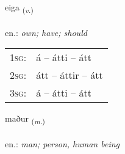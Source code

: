 \documentclass[frontgrid, backgrid]{flacards}\usepackage[]{graphicx}\usepackage[]{xcolor}
\begin{document}
{eiga \small{\textsubscript{(\textit{v.})}} \\[1ex] %
\textphonetic{[eiːɣa]} \\
en.: \emph{own; have; should} \\  [2ex]
\renewcommand*{\arraystretch}{0.8}
\begin{tabular}{p{1cm}l}
\textsc{1sg}: & á -- átti -- átt \\ 
\textsc{2sg}: & átt -- áttir -- átt \\ 
\textsc{3sg}: & á -- átti -- átt \\ 
\end{tabular}
}

\renewcommand{\flhead}{\vskip5pt \fboxsep=0pt {\small\bfseries\footnotesize Nafnorð | Noun}}
\renewcommand{\fcfoot}{\vskip5pt \fboxsep=0pt \hspace{2pt}{\small\bfseries\footnotesize 1K}}

\renewcommand{\blhead}{\vskip5pt {\small\bfseries\footnotesize Nafnorð | Noun }}
\renewcommand{\bcfoot}{\vskip5pt \hspace{2pt}{\small\bfseries\footnotesize 1K}}


{maður \small{\textsubscript{(\textit{m.})}} \\[1ex] %
\textphonetic{[maːðʏr]} \\
en.: \emph{man; person, human being} \\  [2ex]
\renewcommand*{\arraystretch}{0.8}
}


\renewcommand{\flhead}{\vskip5pt \fboxsep=0pt {\small\bfseries\footnotesize Forsetning | Preposition}}
\renewcommand{\fcfoot}{\vskip5pt \fboxsep=0pt \hspace{2pt}{\small\bfseries\footnotesize 1K}}
\end{document}
